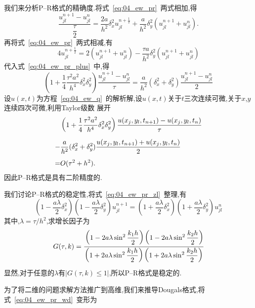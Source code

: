 我们来分析P--R格式的精确度.将式~\ref{eq:04_ew_pr}~两式相加,得
\begin{equation}\label{eq:04_ew_pr_plus}
\dfrac{u_{jl}^{n+1}-u_{jl}^n}{\dfrac{\tau}{2}}=\dfrac{2a}{h^2}\delta_x^2u_{jl}^{n+\tfrac{1}{2}}
+\dfrac{a}{h^2}\delta_y^2(u_{jl}^{n+1}+u_{jl}^n).
\end{equation}
再将式~\ref{eq:04_ew_pr}~两式相减,有
\begin{equation}
4u_{jl}^{n+\frac{1}{2}}=2(u_{jl}^{n+1}+u_{jl}^n)-\dfrac{\tau a}{h^2}\delta_y^2(u_{jl}^{n+1}+u_{jl}^n)
\end{equation}
代入式~\ref{eq:04_ew_pr_plus}~中,得
\begin{equation}\label{eq:04_ew_pr_zl}
\left(1+\dfrac{1}{4}\dfrac{\tau^2 a^2}{h^4}\delta_x^2\delta_y^2\right)\dfrac{u_{jl}^{n+1}-u_{jl}^n}{\tau}
=\dfrac{a}{h^2}(\delta_x^2+\delta_y^2)\dfrac{u_{jl}^{n+1}-u_{jl}^n}{2}
\end{equation}
设$u(x,t)$为方程~\ref{eq:04_ew_q}~的解析解,设$u(x,t)$关于$t$三次连续可微,关于$x$,$y$连续四次可微,利用Taylor级数
展开
\begin{equation*}
\begin{split}
&\left(1+\dfrac{1}{4}\dfrac{\tau^2 a^2}{h^4}\delta_x^2\delta_y^2\right)\dfrac{u(x_j,y_l,t_{n+1})-
u(x_j,y_l,t_n)}{\tau} \\[0.3\baselineskip]
-& \dfrac{a}{h^2}(\delta_x^2+\delta_y^2)\dfrac{u(x_j,y_l,t_{n+1})+u(x_j,y_l,t_n)}{2} \\[0.3\baselineskip]
=& O(\tau^2+h^2).
\end{split}
\end{equation*}
因此P--R格式是具有二阶精度的.\par
我们讨论P--R格式的稳定性,将式~\ref{eq:04_ew_pr_zl}~整理,有
\begin{equation}\label{eq:04_ew_pr_wd}
 \left(1-\dfrac{a\lambda}{2}\delta_x^2\right)\left(1-\dfrac{a\lambda}{2}\delta_y^2\right)u_{jl}^{n+1}
 =\left(1+\dfrac{a\lambda}{2}\delta_x^2\right)\left(1+\dfrac{a\lambda}{2}\delta_y^2\right)u_{jl}^n
\end{equation}
其中,$\lambda=\tau/h^2$,求增长因子为
\begin{equation*}
G(\tau,k)=\cfrac{\left(1-2a\lambda\sin^2\dfrac{k_1h}{2}\right)\left(1-2a\lambda\sin^2\dfrac{k_2h}{2}\right)}
{\left(1+2a\lambda\sin^2\dfrac{k_1h}{2}\right)\left(1+2a\lambda\sin^2\dfrac{k_2h}{2}\right)}
\end{equation*}
显然,对于任意的$\lambda$有$|G(\tau,k)\leq 1|$,所以P--R格式是稳定的.\par
为了将二维的问题求解方法推广到高维,我们来推导Dougals格式,将式~\ref{eq:04_ew_pr_wd}~变形为

